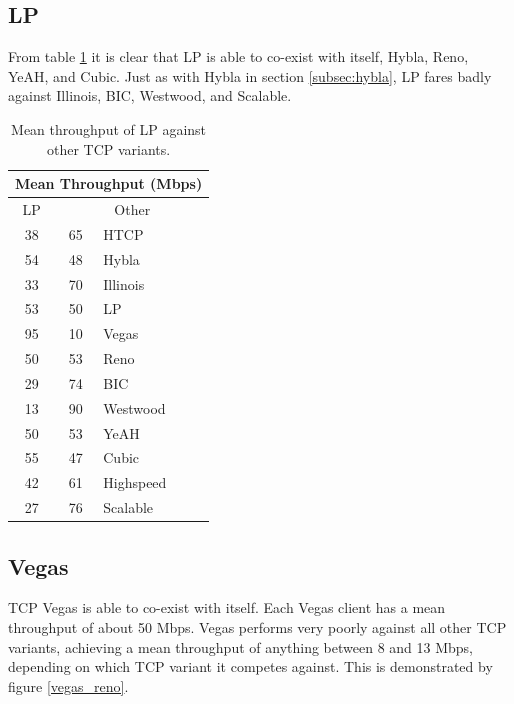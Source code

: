 \documentclass[11pt,a4paper,twocolumn]{article}
\begin{document}
\subsection{LP}
\label{subsec:lp}
From table \ref{table:lp} it is clear that LP is able to co-exist with itself, Hybla, Reno, YeAH, and Cubic.
Just as with Hybla in section \ref{subsec:hybla}, LP fares badly against Illinois, BIC, Westwood, and Scalable.

\begin{table}[h!]
	\begin{center}
		\begin{tabular}{| c | c | l |}
    			\hline
			\multicolumn{3}{|c|}{Mean Throughput (Mbps)} \\
    			\hline
    			LP &  \multicolumn{2}{|c|}{Other}  \\
			\hline
    			38 & 65 & HTCP \\
			\hline
    			54 & 48 & Hybla \\
			\hline
    			33 & 70 & Illinois \\
			\hline
    			53 & 50 & LP \\
			\hline
    			95 & 10 & Vegas \\
			\hline
    			50 & 53 & Reno \\
			\hline
    			29 & 74 & BIC \\
			\hline
    			13 & 90 & Westwood \\
			\hline
    			50 & 53 & YeAH \\
			\hline
    			55 & 47 & Cubic \\
			\hline
    			42 & 61 & Highspeed \\
			\hline
    			27 & 76 & Scalable \\
    			\hline
    		\end{tabular}
  	\end{center}
  	\caption{Mean throughput of LP against other TCP variants.}
	\label{table:lp}
\end{table}

\subsection{Vegas}
\label{subsec:vegas}
TCP Vegas is able to co-exist with itself. Each Vegas client has a mean throughput of about 50 Mbps. Vegas performs very poorly against
all other TCP variants, achieving a mean throughput of anything between 8 and 13 Mbps, depending on which TCP variant it competes against.
This is demonstrated by figure \ref{vegas_reno}.
\end{document}
